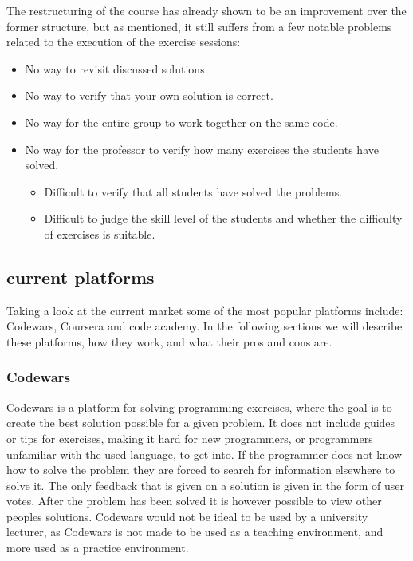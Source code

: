 The restructuring of the course has already shown to be an improvement over the former structure, but as mentioned, it still suffers from a few notable problems related to the execution of the exercise sessions:
\begin{itemize}
	\item No way to revisit discussed solutions.
	\item No way to verify that your own solution is correct.
	\item No way for the entire group to work together on the same code.
	\item No way for the professor to verify how many exercises the students have solved.
	\begin{itemize}
		\item Difficult to verify that all students have solved the problems.
		\item Difficult to judge the skill level of the students and whether the difficulty of exercises is suitable.
	\end{itemize}
\end{itemize}

\subsection{current platforms}
Taking a look at the current market some of the most popular platforms include: Codewars, Coursera and code academy.
In the following sections we will describe these platforms, how they work, and what their pros and cons are.

\subsubsection*{Codewars}
Codewars is a platform for solving programming exercises, where the goal is to create the best solution possible for a given problem. It does not include guides or tips for exercises, making it hard for new programmers, or programmers unfamiliar with the used language, to get into. If the programmer does not know how to solve the problem they are forced to search for information elsewhere to solve it. The only feedback that is given on a solution is given in the form of user votes. After the problem has been solved it is however possible to view other peoples solutions\cite{Codewars}. 
Codewars would not be ideal to be used by a university lecturer, as Codewars is not made to be used as a teaching environment, and more used as a practice environment.

